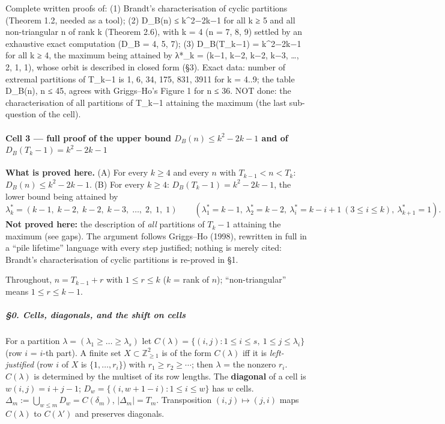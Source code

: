 
Complete written proofs of: (1) Brandt's characterisation of cyclic
partitions (Theorem 1.2, needed as a tool); (2) D\_B(n) ≤ k\^{}2−2k−1
for all k ≥ 5 and all non-triangular n of rank k (Theorem 2.6), with k =
4 (n = 7, 8, 9) settled by an exhaustive exact computation (D\_B = 4, 5,
7); (3) D\_B(T\_k−1) = k\^{}2−2k−1 for all k ≥ 4, the maximum being
attained by λ*\_k = (k−1, k−2, k−2, k−3, \ldots, 2, 1, 1), whose orbit
is described in closed form (§3). Exact data: number of extremal
partitions of T\_k−1 is 1, 6, 34, 175, 831, 3911 for k = 4..9; the table
D\_B(n), n ≤ 45, agrees with Griggs--Ho's Figure 1 for n ≤ 36. NOT done:
the characterisation of all partitions of T\_k−1 attaining the maximum
(the last sub-question of the cell).


\paragraph{\texorpdfstring{Cell 3 --- full proof of the upper bound
\(D_B(n)\le k^2-2k-1\) and of
\(D_B(T_k-1)=k^2-2k-1\)}{Cell 3 --- full proof of the upper bound D\_B(n)\textbackslash le k\^{}2-2k-1 and of D\_B(T\_k-1)=k\^{}2-2k-1}}\label{cell-3-full-proof-of-the-upper-bound-d_bnle-k2-2k-1-and-of-d_bt_k-1k2-2k-1}

\textbf{What is proved here.} (A) For every \(k\ge 4\) and every \(n\)
with \(T_{k-1}<n<T_k\): \(D_B(n)\le k^2-2k-1\). (B) For every
\(k\ge 4\): \(D_B(T_k-1)=k^2-2k-1\), the lower bound being attained by
\[\lambda^*_k=(k-1,\;k-2,\;k-2,\;k-3,\;\dots,\;2,\;1,\;1)\qquad(\lambda^*_1=k-1,\ \lambda^*_2=k-2,\ \lambda^*_i=k-i+1\ (3\le i\le k),\ \lambda^*_{k+1}=1).\]
\textbf{Not proved here:} the description of \emph{all} partitions of
\(T_k-1\) attaining the maximum (see gaps). The argument follows
Griggs--Ho (1998), rewritten in full in a ``pile lifetime'' language
with every step justified; nothing is merely cited: Brandt's
characterisation of cyclic partitions is re-proved in §1.

Throughout, \(n=T_{k-1}+r\) with \(1\le r\le k\) (\(k\) = rank of
\(n\)); ``non-triangular'' means \(1\le r\le k-1\).

\subparagraph{§0. Cells, diagonals, and the shift on
cells}\label{cells-diagonals-and-the-shift-on-cells}

For a partition \(\lambda=(\lambda_1\ge\dots\ge\lambda_s)\) let
\(C(\lambda)=\{(i,j):1\le i\le s,\ 1\le j\le\lambda_i\}\) (row \(i\) =
\(i\)-th part). A finite set \(X\subset\mathbb Z_{\ge1}^2\) is of the
form \(C(\lambda)\) iff it is \emph{left-justified} (row \(i\) of \(X\)
is \(\{1,\dots,r_i\}\)) with \(r_1\ge r_2\ge\cdots\); then \(\lambda\) =
the nonzero \(r_i\). \(C(\lambda)\) is determined by the multiset of its
row lengths. The \textbf{diagonal} of a cell is \(w(i,j)=i+j-1\);
\(D_w=\{(i,w+1-i):1\le i\le w\}\) has \(w\) cells.
\(\Delta_m:=\bigcup_{w\le m}D_w=C(\delta_m)\), \(|\Delta_m|=T_m\).
Transposition \((i,j)\mapsto(j,i)\) maps \(C(\lambda)\) to
\(C(\lambda')\) and preserves diagonals.

